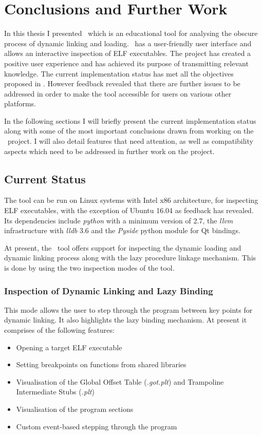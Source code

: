 \chapter{Conclusions and Further Work}
\label{chapter:concl-further}

In this thesis I presented \project\ which is an educational tool for analysing the obscure process of dynamic linking and loading. \project\ has a user-friendly user interface and allows an interactive inspection of ELF executables. The project has created a positive user experience and has achieved its purpose of transmitting relevant knowledge. The current implementation status has met all the objectives proposed in . However feedback revealed that there are further issues to be addressed in order to make the tool accessible for users on various other platforms.

In the following sections I will briefly present the current implementation status along with some of the most important conclusions drawn from working on the \project\ project. I will also detail features that need attention, as well as compatibility aspects which need to be addressed in further work on the project.

\section{Current Status}
\label{sec:current-status}

The tool can be run on Linux systems with Intel x86 architecture, for inspecting ELF executables, with the exception of Ubuntu 16.04 as feedback has revealed. Its dependencies include \textit{python} with a minimum version of 2.7, the \textit{llvm} infrastructure with \textit{lldb} 3.6 and the \textit{Pyside} python module for Qt bindings.

At present, the \project\ tool offers support for inspecting the dynamic loading and dynamic linking process along with the lazy procedure linkage mechanism. This is done by using the two inspection modes of the tool.

\subsection{Inspection of Dynamic Linking and Lazy Binding}
\label{sub-sec:dynlink-curr-sts}

This mode allows the user to step through the program between key points for dynamic linking. It also highlights the lazy binding mechanism. At present it comprises of the following features:
\begin{itemize}
\item Opening a target ELF executable
\item Setting breakpoints on functions from shared libraries
\item Visualisation of the Global Offset Table (\textit{.got.plt}) and Trampoline Intermediate Stubs (\textit{.plt})
\item Visualisation of the program sections
\item Custom event-based stepping through the program
\end{itemize}

